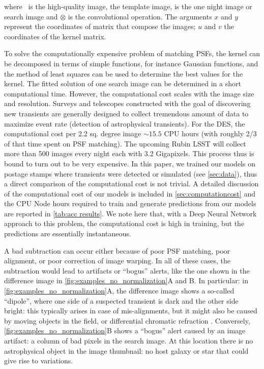 \noindent 
where \temp\ is the high-quality image, the template image, \search is the one night image or search image and $\otimes$ is the convolutional operation. The arguments $x$ and $y$ represent the coordinates of matrix that compose the images; $u$ and $v$ the coordinates of the kernel matrix. 

To solve the computationally expensive problem of matching PSFs, the kernel can be decomposed in terms of simple functions, for instance Gaussian functions, and the method of least squares can be used to determine the best values for the kernel. The fitted solution of one search image can be determined in a short computational time. However, the computational cost scales with the image size and resolution. Surveys and telescopes constructed with the goal of discovering new transients are generally designed to collect tremendous amount of data to maximize event rate (detection of astrophysical transients).  For the DES, the computational cost per 2.2 sq. degree image $\sim 15.5$ CPU hours (with roughly 2/3 of that time spent on PSF matching).  The upcoming Rubin LSST will collect more than 500 images every night each with 3.2 Gigapixels. This process thus is bound to turn out to be very expensive.
In this paper, we trained our models on postage stamps where transients were detected or simulated (see \autoref{sec:data}), thus a direct comparison of the computational cost is not trivial. A detailed discussion of the computational cost of our models is included in \autoref{sec:computationcost} and the CPU Node hours required to train and generate predictions from our models are reported in \autoref{tab:acc results}. We note here that, with a Deep Neural Network approach to this problem, the computational cost is high in training, but the predictions are essentially instantaneous.

A bad subtraction can occur either because of poor PSF matching, poor alignment, or poor correction of image warping. In all of these cases, the subtraction would lead to artifacts or ``bogus'' alerts, like the one shown in the difference image in  \autoref{fig:examples_no_normalization}A and B. In particular: in \autoref{fig:examples_no_normalization}A, the difference image shows a so-called ``dipole'', where one side of a suspected transient is dark and the other side bright: this typically arises in case of mis-alignments, but it might also be caused by moving objects in the field, or differential chromatic refraction \citep{carrascodavis2021alert}. Conversely, \autoref{fig:examples_no_normalization}B shows a ``bogus'' alert caused by an image artifact: a column of bad pixels in the search image. At this location there is no astrophysical object in the image thumbnail: no host galaxy or star that could give rise to variations.

